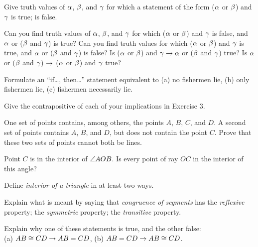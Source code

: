 \documentclass[11pt]{book}
\begin{document}
\begin{exlist}
\item Give truth values of $\alpha$, $\beta$, and $\gamma$ for which a statement of the
  form ($\alpha$ or $\beta$) and $\gamma$ is true; is false.
\item Can you find truth values of $\alpha$, $\beta$, and $\gamma$ for which ($\alpha$ or
  $\beta$) and $\gamma$ is false, and $\alpha$ or ($\beta$ and $\gamma$) is true? Can you
  find truth values for which ($\alpha$ or $\beta$) and $\gamma$ is true, and $\alpha$ or
  ($\beta$ and $\gamma$) is false? Is ($\alpha$ or $\beta$) and
  $\gamma \rightarrow \alpha$ or ($\beta$ and $\gamma$) true? Is $\alpha$ or ($\beta$ and $\gamma$)
  $\rightarrow$ ($\alpha$ or $\beta$) and $\gamma$ true?
\item Formulate an ``if\ldots, then\ldots'' statement equivalent to (a) no
  fishermen lie, (b) only fishermen lie, (c) fishermen necessarily lie.
\item Give the contrapositive of each of your implications in Exercise 3.
\item One set of points contains, among others, the points $A$, $B$, $C$, and
  $D$. A second set of points contains $A$, $B$, and $D$, but does not contain
  the point $C$. Prove that these two sets of points cannot both be lines.
\item Point $C$ is in the interior of $\angle AOB$. Is every point of ray $OC$
  in the interior of this angle?
\item Define \emph{interior of a triangle} in at least two ways.
\item Explain what is meant by saying that \emph{congruence of segments} has
  the \emph{reflexive} property; the \emph{symmetric} property; the
  \emph{transitive} property.
\item Explain why one of these statements is true, and the other false:\\
  (a) $AB \cong CD \rightarrow AB = CD$, (b) $AB = CD \rightarrow AB \cong CD$.
\end{exlist}
\end{document}
